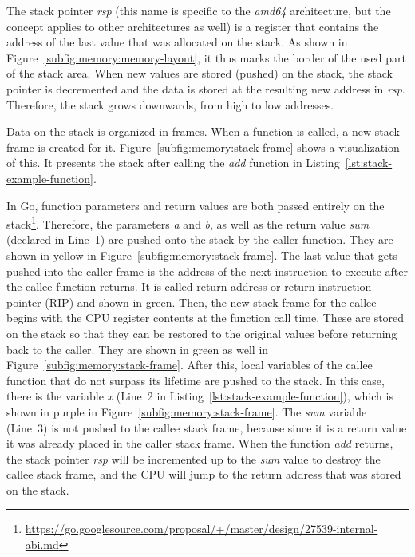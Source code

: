 The stack pointer \textit{rsp} (this name is specific to the \textit{amd64} architecture, but the concept applies to
other architectures as well) is a register that contains the address of the last value that was allocated on the stack.
As shown in Figure~\ref{subfig:memory:memory-layout}, it thus marks the border of the used part of the stack area.
When new values are stored (pushed) on the stack, the stack pointer is decremented and the data is stored at the
resulting new address in \textit{rsp}.
Therefore, the stack grows downwards, from high to low addresses.

Data on the stack is organized in frames.
When a function is called, a new stack frame is created for it.
Figure~\ref{subfig:memory:stack-frame} shows a visualization of this.
It presents the stack after calling the \textit{add} function in Listing~\ref{lst:stack-example-function}.



In Go, function parameters and return values are both passed entirely on the
stack\footnote{\url{https://go.googlesource.com/proposal/+/master/design/27539-internal-abi.md}}.
Therefore, the parameters \textit{a} and \textit{b}, as well as the return value \textit{sum} (declared in Line~1) are
pushed onto the stack by the caller function.
They are shown in yellow in Figure~\ref{subfig:memory:stack-frame}.
The last value that gets pushed into the caller frame is the address of the next instruction to execute after the callee
function returns.
It is called return address or return instruction pointer (\acrshort{RIP}) and shown in green.
Then, the new stack frame for the callee begins with the CPU register contents at the function call time.
These are stored on the stack so that they can be restored to the original values before returning back to the caller.
They are shown in green as well in Figure~\ref{subfig:memory:stack-frame}.
After this, local variables of the callee function that do not surpass its lifetime are pushed to the stack.
In this case, there is the variable \textit{x} (Line~2 in Listing~\ref{lst:stack-example-function}), which is shown in
purple in Figure~\ref{subfig:memory:stack-frame}.
The \textit{sum} variable (Line~3) is not pushed to the callee stack frame, because since it is a return value it was
already placed in the caller stack frame.
When the function \textit{add} returns, the stack pointer \textit{rsp} will be incremented up to the \textit{sum} value
to destroy the callee stack frame, and the CPU will jump to the return address that was stored on the stack.

